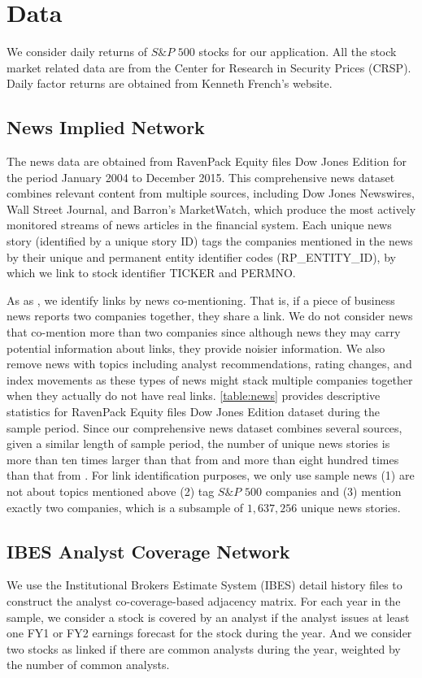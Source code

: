 \section{Data}
We consider daily returns of $S\& P$ $500$ stocks for our application. All the stock market related data are from the Center for Research in Security Prices (CRSP). Daily factor returns are obtained from Kenneth French’s website.
\subsection{News Implied Network}
The news data are obtained from RavenPack Equity files Dow Jones Edition for the period January 2004 to December 2015. This comprehensive news dataset combines relevant content from multiple sources, including Dow Jones Newswires, Wall Street Journal, and Barron's MarketWatch, which produce the most actively monitored streams of news articles in the financial system. Each unique news story (identified by a unique story ID) tags the companies mentioned in the news by their unique and permanent entity identifier codes (RP\_ENTITY\_ID),  by which we link to stock identifier TICKER and PERMNO.

As as \cite{ge2021news}, we identify links by news co-mentioning. That is, if a piece of business news reports two companies together, they share a link. We do not consider news that co-mention more than two companies since although news they may carry potential information about links, they provide noisier information. We also remove news with topics including analyst recommendations, rating changes, and index movements as these types of news might stack multiple companies together when they actually do not have real links. \autoref{table:news} provides descriptive statistics for RavenPack Equity files Dow Jones Edition dataset during the sample period. Since our comprehensive news dataset combines several sources, given a similar length of sample period, the number of unique news stories is more than ten times larger than that from \cite{scherbina2015economic} and more than eight hundred times than that from \cite{schwenkler2019network}. For link identification purposes, we only use sample news (1) are not about topics mentioned above (2) tag $S\& P$ $500$ companies and (3) mention exactly two companies, which is a subsample of $1,637,256$ unique news stories.

\subsection{IBES Analyst Coverage Network}
We use the Institutional Brokers Estimate System (IBES) detail history files to construct the analyst co-coverage-based adjacency matrix. For each year in the sample, we consider a stock is covered by an analyst if the analyst issues at least one FY1 or FY2 earnings forecast for the stock during the year. And we consider two stocks as linked if there are common analysts during the year, weighted by the number of common analysts. 
